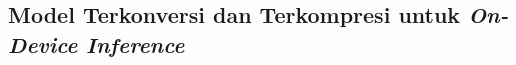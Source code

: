 \subsection{Model Terkonversi dan Terkompresi untuk \emph{On-Device Inference}}
\label{subsec:konversi-dan-kompresi-model}
